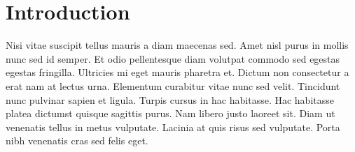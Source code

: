 \chapter{Introduction}

Nisi vitae suscipit tellus mauris a diam maecenas sed. Amet nisl purus in mollis nunc sed id semper. Et odio pellentesque diam volutpat commodo sed egestas egestas fringilla. Ultricies mi eget mauris pharetra et. Dictum non consectetur a erat nam at lectus urna. Elementum curabitur vitae nunc sed velit. Tincidunt nunc pulvinar sapien et ligula. Turpis cursus in hac habitasse. Hac habitasse platea dictumst quisque sagittis purus. Nam libero justo laoreet sit. Diam ut venenatis tellus in metus vulputate. Lacinia at quis risus sed vulputate. Porta nibh venenatis cras sed felis eget.